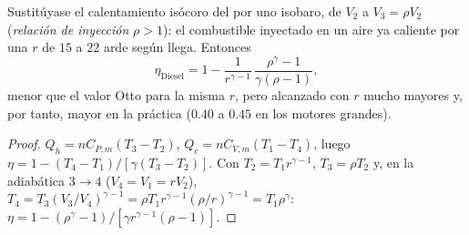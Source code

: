 \begin{proposition}\label{prop:b1:heat-engines:diesel}
Sustitúyase el calentamiento isócoro del  por uno isobaro, de
$V_2$ a $V_3 = \rho V_2$ (\emph{relación de inyección} $\rho > 1$): el
combustible inyectado en un aire ya caliente por una  $r$ de $15$ a $22$ arde según llega. Entonces
\[
\eta_{\text{Diesel}} = 1 - \frac{1}{r^{\gamma-1}}\,\frac{\rho^{\gamma} - 1}{\gamma(\rho - 1)} ,
\]
menor que el valor Otto para la misma $r$, pero alcanzado con $r$ mucho
mayores y, por tanto, mayor en la práctica ($0.40$ a $0.45$ en los motores grandes).
\end{proposition}

\begin{proof}
$Q_h = nC_{P,m}(T_3 - T_2)$, $Q_c = nC_{V,m}(T_1 - T_4)$, luego $\eta = 1 -
(T_4 - T_1)/[\gamma(T_3 - T_2)]$. Con $T_2 = T_1r^{\gamma-1}$, $T_3 =
\rho T_2$ y, en la adiabática $3 \to 4$ ($V_4 = V_1 = rV_2$), $T_4 =
T_3(V_3/V_4)^{\gamma-1} = \rho T_1 r^{\gamma-1}(\rho/r)^{\gamma-1} = T_1\rho^{\gamma}$:
$\eta = 1 - (\rho^\gamma - 1)/[\gamma r^{\gamma-1}(\rho - 1)]$.
\end{proof}

